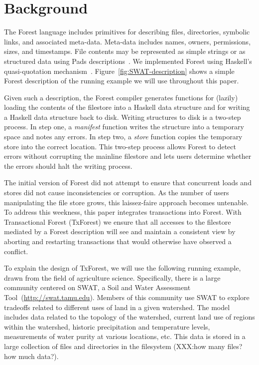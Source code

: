 \section{Background}
\label{sec:Background}


The Forest language includes primitives for describing files,
directories, symbolic links, and associated meta-data.  Meta-data
includes names, owners, permissions, sizes, and timestamps.  File
contents may be represented as simple strings or as structured data
using Pads descriptions~\cite{pads}.  We implemented Forest using
Haskell's quasi-quotation mechanism~\cite{haskell-quasi-quote}.
Figure~\ref{fig:SWAT-description} shows a simple Forest
description of the running example we will use throughout this paper.

Given such a description, the Forest compiler generates functions for
(lazily) loading the contents of the filestore into a Haskell data
structure and for writing a Haskell data structure back to disk.
Writing structures to disk is a two-step process.  In step one, a
\textit{manifest} function writes the structure into a temporary space
and notes any errors.  In step two, a \textit{store} function copies
the temporary store into the correct location.  This two-step process
allows Forest to detect errors without corrupting the mainline
filestore and lets users determine whether the errors should halt the
writing process.

The initial version of Forest did not attempt to ensure that 
concurrent loads and stores did not cause inconsistencies or
corruption.  As the number of users manipulating the file store grows,
this laissez-faire approach becomes untenable.  To address this
weekness, this paper integrates transactions into Forest.  With
Transactional Forest (TxForest) we ensure that all accesses to the
filestore mediated by a Forest description will see and maintain a
consistent view by aborting and restarting transactions that would
otherwise have observed a conflict.

To explain the design of TxForest, we will use the following running
example, drawn from the field of agriculture science.  Specifically,
there is a large community centered on SWAT, a Soil and Water
Assessment Tool~\cite{SWAT}(\url{http://swat.tamu.edu}).  Members of
this community use SWAT to explore tradeoffs related to different uses
of land in a given watershed.  The model includes data related to the
topology of the watershed, current land use of regions within the
watershed, historic precipitation and temperature levels, measurements
of water purity at various locations, etc.  This data is stored in a
large collection of files and directories in the filesystem (XXX:how
many files? how much data?).

